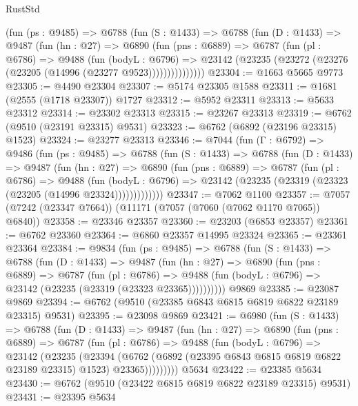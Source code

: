 \begin{lexlean}{RustStd}
\begin{coremodule}
        (fun (ps : @9485) =>
        @6788
          (fun (S : @1433) =>
          @6788
            (fun (D : @1433) =>
            @9487
              (fun (hn : @27) =>
              @6890
                (fun (pns : @6889) =>
                @6787
                  (fun (pl : @6786) =>
                  @9488
                    (fun (bodyL : @6796) =>
                    @23142 (@23235 (@23272 (@23276 (@23205 (@14996 (@23277 @9523)))))))))))))))
@23304 := @1663 @5665 @9773
@23305 := @4490 @23304
@23307 := @5174 @23305 @1588
@23311 := @1681 (@2555 (@1718 @23307)) @1727
@23312 := @5952 @23311
@23313 := @5633 @23312
@23314 := @23302 @23313
@23315 := @23267 @23313
@23319 := @6762 (@9510 (@23191 @23315) @9531)
@23323 := @6762 (@6892 (@23196 @23315) @1523)
@23324 := @23277 @23313
@23346 := @7044
    (fun (Γ : @6792) =>
    @9486
      (fun (ps : @9485) =>
      @6788
        (fun (S : @1433) =>
        @6788
          (fun (D : @1433) =>
          @9487
            (fun (hn : @27) =>
            @6890
              (fun (pns : @6889) =>
              @6787
                (fun (pl : @6786) =>
                @9488
                  (fun (bodyL : @6796) =>
                  @23142 (@23235 (@23319 (@23323 (@23205 (@14996 @23324)))))))))))))
@23347 := @7062 @1100
@23357 := @7057 (@7242 (@23347 @7664)) (@11171 (@7057 (@7060 (@7062 @1170 @7065)) @6840))
@23358 := @23346 @23357
@23360 := @23203 (@6853 @23357)
@23361 := @6762 @23360
@23364 := @6860 @23357 @14995 @23324
@23365 := @23361 @23364
@23384 := @9834
    (fun (ps : @9485) =>
    @6788
      (fun (S : @1433) =>
      @6788
        (fun (D : @1433) =>
        @9487
          (fun (hn : @27) =>
          @6890
            (fun (pns : @6889) =>
            @6787
              (fun (pl : @6786) =>
              @9488 (fun (bodyL : @6796) => @23142 (@23235 (@23319 (@23323 @23365))))))))))
    @9869
@23385 := @23087 @9869
@23394 := @6762 (@9510 (@23385 @6843 @6815 @6819 @6822 @23189 @23315) @9531)
@23395 := @23098 @9869
@23421 := @6980
    (fun (S : @1433) =>
    @6788
      (fun (D : @1433) =>
      @9487
        (fun (hn : @27) =>
        @6890
          (fun (pns : @6889) =>
          @6787
            (fun (pl : @6786) =>
            @9488
              (fun (bodyL : @6796) =>
              @23142
                (@23235
                  (@23394
                    (@6762
                      (@6892 (@23395 @6843 @6815 @6819 @6822 @23189 @23315) @1523)
                      @23365)))))))))
    @5634
@23422 := @23385 @5634
@23430 := @6762 (@9510 (@23422 @6815 @6819 @6822 @23189 @23315) @9531)
@23431 := @23395 @5634

\end{coremodule}
\end{lexlean}
